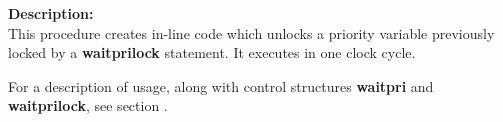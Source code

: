         {\bf Description:} \\
        This procedure creates in-line code which unlocks a priority variable
        previously locked by a {\bf waitprilock} statement. It executes in
        one clock cycle.
        
        For a description of usage, along with control structures
        {\bf waitpri} and {\bf waitprilock}, see section .



%        
%        
%        
%        
%        
%        
%        
%        
